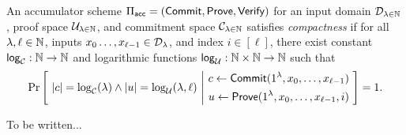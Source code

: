\newcommand{\polylog}{\ms{polylog}}
\newcommand{\len}{\ms{len}}
\newcommand{\logg}{{\ms{log}}}

\begin{definition}[Compactness]
    \label{def:compactness}
    An accumulator scheme $\Pi_{\mathsf{acc}} = (\mathsf{Commit}, \mathsf{Prove}, \mathsf{Verify})$ for an input
    domain $\mathcal{D}_{\lambda \in \mathbb{N}}$, proof space $\mathcal{U}_{\lambda \in \mathbb{N}}$, and
    commitment space $\mathcal{C}_{\lambda \in \mathbb{N}}$ satisfies \emph{compactness}
    if for all $\lambda, \ell \in \mathbb{N}$, inputs $x_0 \ldots, x_{\ell-1} \in
    \mathcal{D}_\lambda$, and index $i \in [\ell]$, there exist constant $\logg_\calC:
    \N \to \N$ and logarithmic functions $\logg_{\calU}: \N \times \N \to \N$
    such that
    \[ \Pr \left[~ |c| = \log_{\mathcal{C}}(\lambda) \land |u| = \log_{\mathcal{U}}(\lambda,
        \ell) ~\Bigg|~ \begin{aligned} c \gets \mathsf{Commit}(1^\lambda, x_0, \ldots,
        x_{\ell-1}) \\ u \gets \mathsf{Prove}(1^\lambda, x_0, \ldots, x_{\ell-1}, i) 
        \end{aligned} ~\right] = 1 .\]
\end{definition}

\begin{definition}[Soundness]
    \label{def:soundness}
    To be written...
\end{definition}

